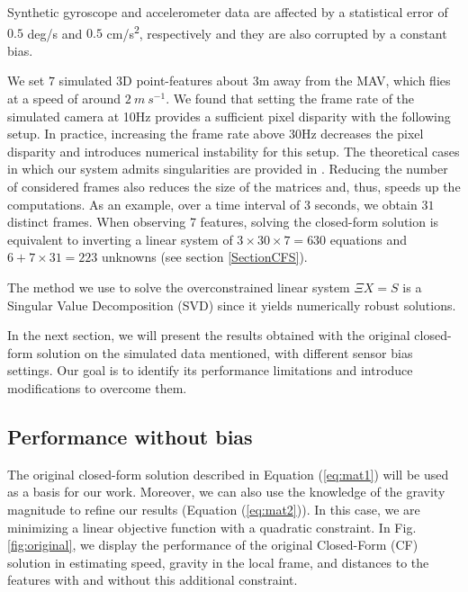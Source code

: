 \documentclass[letterpaper, 10pt, conference, final]{ieeeconf}  %
\begin{document}
Synthetic gyroscope and accelerometer data are affected by a statistical error of $0.5$ deg/s and $0.5$ cm/s\textsuperscript{2}, respectively and they are also corrupted by a constant bias.

We set $7$ simulated 3D point-features about $3$m away from the MAV, which flies at a speed of around $2~m~s^{-1}$.
We found that setting the frame rate of the simulated camera at 10Hz provides a sufficient pixel disparity with the following setup.
In practice, increasing the frame rate above 30Hz decreases the pixel disparity and introduces numerical instability for this setup.
The theoretical cases in which our system admits singularities are provided in \cite{Martinelli2012, Martinelli2014}.
Reducing the number of considered frames also reduces the size of the matrices and, thus, speeds up the computations.
As an example, over a time interval of 3 seconds, we obtain $31$ distinct frames.
When observing 7 features, solving the closed-form solution is equivalent to inverting a linear system of $3\times 30\times 7 = 630$ equations and $6+7\times 31=223$ unknowns (see section \ref{SectionCFS}).

The method we use to solve the overconstrained linear system $\Xi X = S$ is a Singular Value Decomposition (SVD) since it yields numerically robust solutions.

In the next section, we will present the results obtained with the original closed-form solution on the simulated data mentioned, with different sensor bias settings.
Our goal is to identify its performance limitations and introduce modifications to overcome them.



\subsection{Performance without bias}

The original closed-form solution described in Equation (\ref{eq:mat1}) will be used as a basis for our work.
Moreover, we can also use the knowledge of the gravity magnitude to refine our results (Equation (\ref{eq:mat2})).
In this case, we are minimizing a linear objective function with a quadratic constraint.
In Fig. \ref{fig:original}, we display the performance of the original Closed-Form (CF) solution in estimating speed, gravity in the local frame, and distances to the features with and without this additional constraint.
\end{document}
